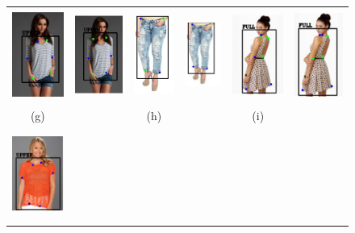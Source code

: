 \documentclass[conference]{IEEEtran}
\begin{document}
\begin{figure}
\begin{tabular} {cccccc}
{\includegraphics[align=c, width = 0.8in, height= 3cm]{images/gt_7.PNG}} &
{\includegraphics[align=c, width = 0.8in, height= 3cm]{images/p_7.PNG}} &
{\includegraphics[align=c, width = 0.6in, height= 3cm]{images/gt_8.PNG}} &
{\includegraphics[align=c, width = 0.6in, height= 3cm]{images/p_8.PNG}} &
{\includegraphics[align=c, width = 0.8in, height= 3cm]{images/gt_9.PNG}} &
{\includegraphics[align=c, width = 0.8in, height= 3cm]{images/p_9.PNG}} \\
(g) &  & (h) & & (i) &\\
{\includegraphics[align=c, width = 0.8in, height= 3cm]{images/gt_10.PNG}} &

\end{tabular}
\end{figure}
\end{document}
